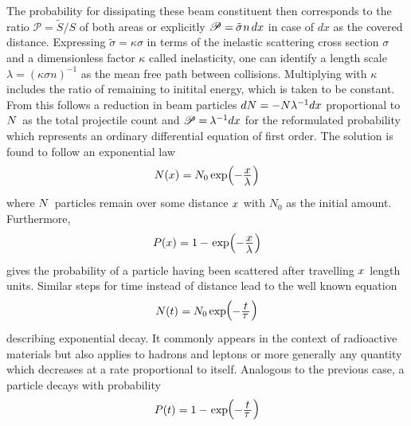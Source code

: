The probability for dissipating these beam constituent then corresponds to the ratio $\mathscr{P} = \tilde{S} / S$ of both areas or
explicitly $\mathscr{P} = \kern-0.5pt \tilde{\sigma} \kern+0.5pt n \kern+1.5pt dx$ in case of $dx$ as the covered distance.
Expressing $\tilde{\sigma} = \kappa\sigma$ in terms of the inelastic scattering cross section $\sigma$ and a dimensionless factor
$\kappa$ called inelasticity, one can identify a length scale $\lambda = (\kappa\sigma n)^{-1}$ as the mean free path between
collisions. Multiplying with $\kappa$ includes the ratio of remaining to initital energy, which is taken to be constant. From this
follows a reduction in beam particles $dN \kern+0.1pt = - N \lambda^{-1} dx$ proportional to $N \kern+1.0pt$ as the total projectile
count and $\mathscr{P} = \kern-0.6pt \lambda^{-1} dx$ for the reformulated probability which represents an ordinary differential equation
of first order. The solution is found to follow an exponential law
\begin{equation*}
	N(x) \kern+0.4pt = N_0 \exp \Bigl( -\frac{\raisebox{-0.5ex}{$x$}}{\raisebox{0.5ex}{$\lambda \kern+0.3pt$}} \kern+0.5pt \Bigr)
\end{equation*}
where $N \kern+1.0pt$ particles remain over some distance $x \kern+0.5pt$ with $N_0$ as the initial amount. Furthermore,
\begin{equation*}
	P(x) \kern+0.3pt = 1 -
	\kern+0.9pt \exp \Bigl( -\frac{\raisebox{-0.5ex}{$x$}}{\raisebox{0.5ex}{$\lambda \kern+0.3pt$}}\kern+0.5pt \Bigr)
\end{equation*}
gives the probability of a particle having been scattered after travelling $x \kern+0.5pt$ length units. Similar steps
for time instead of distance lead to the well known equation
\begin{equation*}
	N(t) \kern+0.4pt = N_0 \exp \kern-2.0pt
	\raisebox{0.25ex}{\(\Bigl( \raisebox{-0.25ex}{\(-\frac{\raisebox{-0.5ex}{$t$}}{\raisebox{1.0ex}{$\tau \kern+1.0pt$}}\)}
	\kern+0.5pt \Bigr)\)}
\end{equation*}
describing exponential decay. It commonly appears in the context of radioactive materials but also applies to hadrons and leptons
or more generally any quantity which decreases at a rate proportional to itself. Analogous to the previous case, a particle
decays with probability
\begin{equation*}
	P(t) \kern+0.3pt = 1 - \kern+0.9pt \exp \kern-2.0pt
	\raisebox{0.25ex}{\(\Bigl( \raisebox{-0.25ex}{\(-\frac{\raisebox{-0.5ex}{$t$}}{\raisebox{1.0ex}{$\tau \kern+1.0pt$}}\)}
	\kern+0.5pt \Bigr)\)}
\end{equation*}
